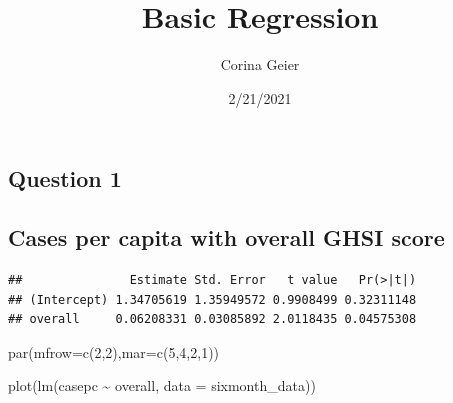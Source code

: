 \documentclass[
]{article}
\title{Basic Regression}
\author{Corina Geier}
\date{2/21/2021}
\newenvironment{Shaded}{\begin{snugshade}}{\end{snugshade}}
\newcommand{\AttributeTok}[1]{\textcolor[rgb]{0.77,0.63,0.00}{#1}}
\newcommand{\DecValTok}[1]{\textcolor[rgb]{0.00,0.00,0.81}{#1}}
\newcommand{\FunctionTok}[1]{\textcolor[rgb]{0.00,0.00,0.00}{#1}}
\newcommand{\NormalTok}[1]{#1}
\newcommand{\SpecialCharTok}[1]{\textcolor[rgb]{0.00,0.00,0.00}{#1}}
\begin{document}
\maketitle

\hypertarget{question-1}{%
\subsection{Question 1}\label{question-1}}

\hypertarget{cases-per-capita-with-overall-ghsi-score}{%
\subsection{Cases per capita with overall GHSI
score}\label{cases-per-capita-with-overall-ghsi-score}}

\begin{Shaded}
\end{Shaded}

\begin{verbatim}
##               Estimate Std. Error   t value   Pr(>|t|)
## (Intercept) 1.34705619 1.35949572 0.9908499 0.32311148
## overall     0.06208331 0.03085892 2.0118435 0.04575308
\end{verbatim}

\begin{Shaded}
\begin{Highlighting}[]
\FunctionTok{par}\NormalTok{(}\AttributeTok{mfrow=}\FunctionTok{c}\NormalTok{(}\DecValTok{2}\NormalTok{,}\DecValTok{2}\NormalTok{),}\AttributeTok{mar=}\FunctionTok{c}\NormalTok{(}\DecValTok{5}\NormalTok{,}\DecValTok{4}\NormalTok{,}\DecValTok{2}\NormalTok{,}\DecValTok{1}\NormalTok{))}

\FunctionTok{plot}\NormalTok{(}\FunctionTok{lm}\NormalTok{(casepc }\SpecialCharTok{\textasciitilde{}}\NormalTok{ overall, }\AttributeTok{data =}\NormalTok{ sixmonth\_data))}
\end{Highlighting}
\end{Shaded}
\end{document}
